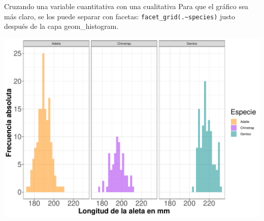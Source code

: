 \documentclass[
  ignorenonframetext,
  aspectratio=169]{beamer}
\begin{document}
\begin{frame}[fragile]{Cruzando una variable cuantitativa con una
cualitativa}
\protect\hypertarget{cruzando-una-variable-cuantitativa-con-una-cualitativa-2}{}
Para que el gráfico sea más claro, se los puede separar con facetas:
\texttt{facet\_grid(.\textasciitilde{}species)} justo después de la capa
geom\_histogram.

\begin{center}\includegraphics[width=0.6\linewidth,height=0.6\textheight]{tidyverse_AD_files/figure-beamer/unnamed-chunk-135-1} \end{center}
\end{frame}
\end{document}
